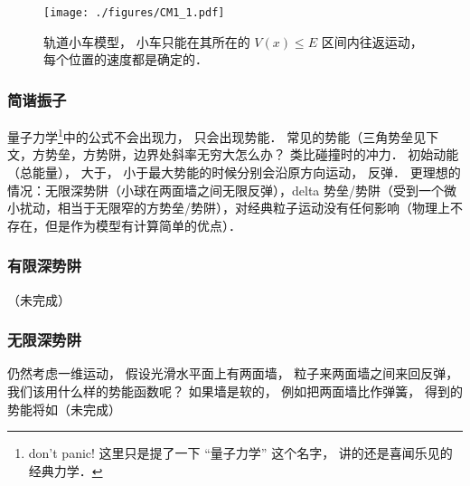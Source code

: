 \begin{figure}[ht]
\centering
\texttt{[image: ./figures/CM1\_1.pdf]}
\caption{轨道小车模型， 小车只能在其所在的 $V(x) \leqslant E$ 区间内往返运动， 每个位置的速度都是确定的．} \label{CM1_fig1}
\end{figure}


\subsubsection{简谐振子}



量子力学\footnote{don't panic! 这里只是提了一下 “量子力学” 这个名字， 讲的还是喜闻乐见的经典力学．}中的公式不会出现力， 只会出现势能． 常见的势能（三角势垒见下文，方势垒，方势阱，边界处斜率无穷大怎么办？ 类比碰撞时的冲力． 初始动能（总能量）， 大于， 小于最大势能的时候分别会沿原方向运动， 反弹． 更理想的情况：无限深势阱（小球在两面墙之间无限反弹），delta 势垒/势阱（受到一个微小扰动，相当于无限窄的方势垒/势阱），对经典粒子运动没有任何影响（物理上不存在，但是作为模型有计算简单的优点）．

\subsubsection{有限深势阱}
（未完成）

\subsubsection{无限深势阱}
仍然考虑一维运动， 假设光滑水平面上有两面墙， 粒子来两面墙之间来回反弹， 我们该用什么样的势能函数呢？ 如果墙是软的， 例如把两面墙比作弹簧， 得到的势能将如（未完成）
